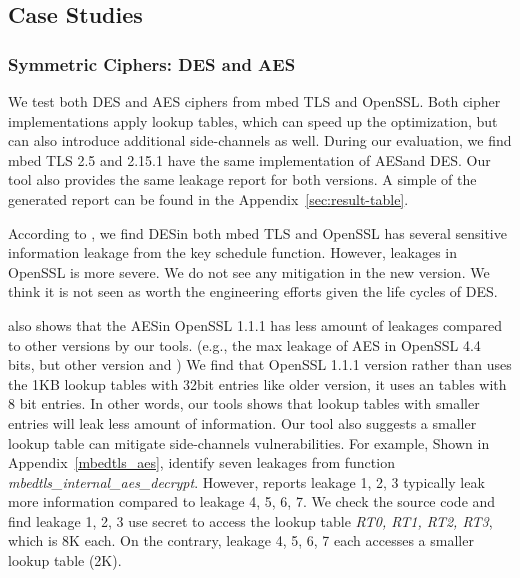 \subsection{Case Studies}

\subsubsection{Symmetric Ciphers: DES and AES}\label{eval:sym}
We test both DES and AES ciphers from mbed TLS and OpenSSL. Both cipher
implementations apply lookup tables, which can
speed up the optimization, but can also introduce additional side-channels
as well. During our evaluation, we find mbed TLS 2.5 and 2.15.1 have the same
implementation of AES\@ and DES\@. Our tool also provides the same leakage report for both
versions. A simple of the generated report can be found in the Appendix~\ref{sec:result-table}.

According to \tool{}, we find DES\@ in both mbed TLS and OpenSSL has several
sensitive information leakage from the key schedule function.
However, leakages in OpenSSL is more severe. We do not see any mitigation
in the new version. We think it is not seen as worth the engineering
efforts given the life cycles of DES\@.

\tool{} also shows that the AES\@ in OpenSSL 1.1.1 
has less amount of leakages compared to other versions by our tools. 
(e.g., the max leakage of AES in OpenSSL 4.4 bits, but other version
and )
We find that OpenSSL 1.1.1 version 
rather than uses the 1KB lookup tables with 32bit entries like older version, it uses an 
tables with 8 bit entries. In other words, our tools shows that lookup tables with smaller 
entries will leak less amount of information. Our tool also suggests a smaller lookup
table can mitigate side-channels vulnerabilities. For example, Shown in Appendix~\ref{mbedtls_aes},
\tool{} identify seven leakages from function \emph{mbedtls\_internal\_aes\_decrypt}.
However, \tool{} reports leakage 1, 2, 3 typically leak more information
compared to leakage 4, 5, 6, 7. 
We check the source code and find leakage 1, 2,
3 use secret to access the lookup table \emph{RT0, RT1, RT2, RT3}, which is 8K
each. On the contrary, leakage 4, 5, 6, 7 each accesses a smaller lookup table
(2K).



